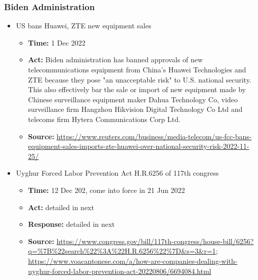 		\subsubsection{Biden Administration}
			\begin{itemize}
			\item US bans Huawei, ZTE new equipment sales
				\begin{itemize}
				\item \textbf{Time: }1 Dec 2022
				\item \textbf{Act: }Biden administration has banned approvals of new telecommunications equipment from China's Huawei Technologies and ZTE because they pose "an unacceptable risk" to U.S. national security. This also effectively bar the sale or import of new equipment made by Chinese surveillance equipment maker Dahua Technology Co, video surveillance firm Hangzhou Hikvision Digital Technology Co Ltd and telecoms firm Hytera Communications Corp Ltd.
				\item	\textbf{Source: }\url{https://www.reuters.com/business/media-telecom/us-fcc-bans-equipment-sales-imports-zte-huawei-over-national-security-risk-2022-11-25/}
				\end{itemize}

			\item	 Uyghur Forced Labor Prevention Act H.R.6256 of 117th congress
				\begin{itemize}
				\item \textbf{Time: }12 Dec 202, come into force in 21 Jun 2022
				\item \textbf{Act: } detailed in next
				\item \textbf{Response: } detailed in next
				\item	\textbf{Source: } \url{https://www.congress.gov/bill/117th-congress/house-bill/6256?q=\%7B\%22search\%22\%3A\%22H.R.6256\%22\%7D\&s=3\&r=1}; \url{https://www.voacantonese.com/a/how-are-companies-dealing-with-uyghur-forced-labor-prevention-act-20220806/6694084.html}
				\end{itemize}
				

\end{itemize}
